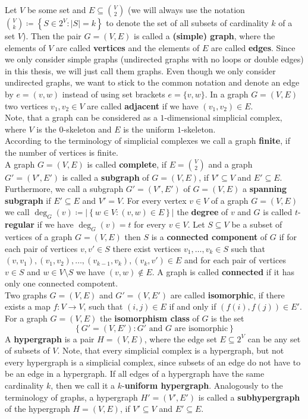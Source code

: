 Let \(V\) be some set and \(E\subseteq\binom{V}{2}\) (we will always use the notation\\
\(\binom{V}{k}\coloneqq \left\{S\in 2^V:\left|S\right|=k\right\}\) to denote the set of all subsets of cardinality \(k\) of a set \(V\)). Then the pair \(G=\left(V,E\right)\) is called a \textbf{(simple) graph}, where the elements of \(V\) are called \textbf{vertices} and the elements of \(E\) are called \textbf{edges}. Since we only consider simple graphs (undirected graphs with no loops or double edges) in this thesis, we will just call them graphs. Even though we only consider undirected graphs, we want to stick to the common notation and denote an edge by \(e=(v,w)\) instead of using set brackets \(e=\{v,w\}\). In a graph \(G=(V,E)\) two vertices \(v_1,v_2\in V\) are called \textbf{adjacent} if we have \((v_1,v_2)\in E\).\\
Note, that a graph can be considered as a \(1\)-dimensional simplicial complex, where \(V\) is the \(0\)-skeleton and \(E\) is the uniform \(1\)-skeleton.\\
According to the terminology of simplicial complexes we call a graph \textbf{finite}, if the number of vertices is finite.\\
A graph \(G=(V,E)\) is called \textbf{complete}, if \(E=\binom{V}{2}\) and a graph \(G'=(V',E')\) is called a \textbf{subgraph} of \(G=(V,E)\), if \(V'\subseteq V\) and \(E'\subseteq E\). Furthermore, we call a subgraph \(G'=(V',E')\) of \(G=(V,E)\) a \textbf{spanning subgraph} if \(E'\subseteq E\) and \(V'=V\). For every vertex \(v\in V\) of a graph \(G=(V,E)\) we call \(\deg_G(v)\coloneqq \left|\left\{w\in V:(v,w)\in E\right\}\right|\) the \textbf{degree} of \(v\) and \(G\) is called \(t\)-\textbf{regular} if we have \(\deg_G(v)=t\) for every \(v\in V\). Let \(S\subseteq V\) be a subset of vertices of a graph \(G=(V,E)\) then \(S\) is a \textbf{connected component} of \(G\) if for each pair of vertices \(v,v'\in S\) there exist vertices \(v_1,\ldots,v_k\in S\) such that \((v,v_1),(v_1,v_2),\ldots,(v_{k-1},v_k),(v_k,v')\in E\) and for each pair of vertices \(v\in S\) and \(w\in V\setminus S\) we have \((v,w)\notin E\). A graph is called \textbf{connected} if it has only one connected compotent.\\
Two graphs \(G=(V,E)\) and \(G'=(V,E')\) are called \textbf{isomorphic}, if there exists a map \(f:V\rightarrow V\), such that \((i,j)\in E\) if and only if \((f(i),f(j))\in E'\). For a graph \(G=(V,E)\) the \textbf{isomorphism class} of \(G\) is the set
\[
\left\{G'=(V,E'):G'\text{ and }G\text{ are isomorphic}\right\}
\]
A \textbf{hypergraph} is a pair \(H=(V,E)\), where the edge set \(E\subseteq 2^V\) can be any set of subsets of \(V\). Note, that every simplicial complex is a hypergraph, but not every hypergraph is a simplicial complex, since subsets of an edge do not have to be an edge in a hypergraph. If all edges of a hypergraph have the same cardinality \(k\), then we call it a \(k\)-\textbf{uniform hypergraph}. Analogously to the terminology of graphs, a hypergraph \(H'=(V',E')\) is called a \textbf{subhypergraph} of the hypergraph \(H=(V,E)\), if \(V'\subseteq V\) and \(E'\subseteq E\).

